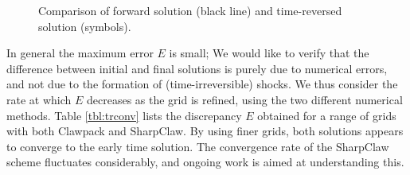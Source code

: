 \begin{figure}
\centerline{
}
\caption[Comparison of forward solution and time-reversed solution 
stegotons.]{Comparison of forward solution (black line) and 
time-reversed solution (symbols).\label{fig:stego_tr}}
\end{figure}

In general the maximum error $E$ is small; We would like to verify 
that the difference between 
initial and final solutions is purely due to numerical errors, and not
due to the formation of (time-irreversible) shocks.  We thus consider
the rate at which $E$ decreases as the grid is refined, using the two 
different numerical methods.
Table \ref{tbl:trconv} lists 
the discrepancy $E$ obtained for a range of grids with both Clawpack and SharpClaw.
By using finer grids, both solutions appears to converge to the early time solution.
The convergence rate of the SharpClaw scheme fluctuates considerably, and
ongoing work is aimed at understanding this.


